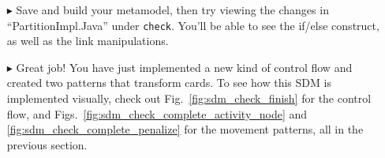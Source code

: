\begin{itemize}
\item[$\blacktriangleright$] Save and build your metamodel, then try viewing the changes in ``PartitionImpl.Java'' under \texttt{check}. You'll be able to
see the if/else construct, as well as the link manipulations. 

\item[$\blacktriangleright$] Great job! You have just implemented a new kind of control flow and created two patterns that transform cards.
To see how this SDM is implemented visually, check out Fig.~\ref{fig:sdm_check_finish} for the control flow, and Figs.~\ref{fig:sdm_check_complete_activity_node} and
\ref{fig:sdm_check_complete_penalize} for the movement patterns, all in the previous section.

\end{itemize}
 